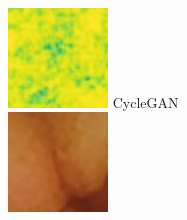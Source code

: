 \documentclass[conference]{IEEEtran}
\begin{document}
\begin{figure}[!t]
         \\
        \vfill
        \includegraphics[width=\linewidth]{Figures/983/983_cycleGAN_ssim.jpg}
        CycleGAN \\
    \endminipage\hfill
        \centering
        \includegraphics[width=\linewidth]{Figures/983/983_DenseNet.jpg}

\end{figure}
\end{document}
